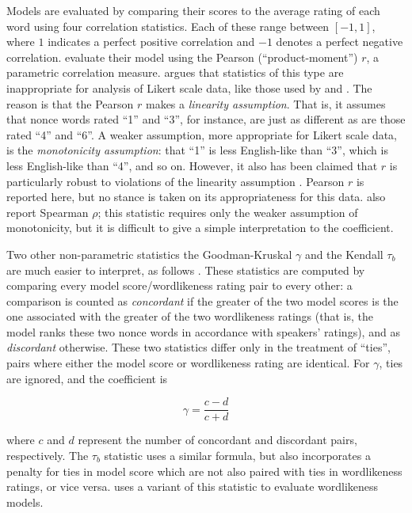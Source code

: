 Models are evaluated by comparing their scores to the average rating of each word using four correlation statistics. Each of these range between $[-1, 1]$, where $1$ indicates a perfect positive correlation and $-1$ denotes a perfect negative correlation. \citet{Hayes2008a} evaluate their model using the Pearson (``product-moment'') $r$, a parametric correlation measure.  \citet{Stevens1946} argues that statistics of this type are inappropriate for analysis of Likert scale data, like those used by \citet{Albright2007} and \citet{Albright2003b}.
The reason is that the Pearson $r$ makes a \emph{linearity assumption}. That is, it assumes that nonce words rated ``1'' and  ``3'', for instance, are just as different as are those rated ``4'' and ``6''. A weaker assumption, more appropriate for Likert scale data, is the \emph{monotonicity assumption}: that ``1'' is less English-like than ``3'', which is less English-like than ``4'', and so on. However, it also has been claimed that $r$ is particularly robust to violations of the linearity assumption \citep[e.g.,][]{Havlicek1976}. Pearson $r$ is reported here, but no stance is taken on its appropriateness for this data.
\citeauthor{Hayes2008a} also report Spearman $\rho$; this statistic requires only the weaker assumption of monotonicity, but it is difficult to give a simple interpretation to the coefficient. 

Two other non-parametric statistics the Goodman-Kruskal $\gamma$ and the Kendall $\tau_b$ are much easier to interpret, as follows \citep{Noether1981}. 
These statistics are computed by comparing every model score/wordlikeness rating pair to every other: a comparison is counted as \emph{concordant} if the greater of the two model scores is the one associated with the greater of the two wordlikeness ratings (that is, the model ranks these two nonce words in accordance with speakers' ratings), and as \emph{discordant} otherwise. 
These two statistics differ only in the treatment of ``ties'', pairs where either the model score or wordlikeness rating are identical. 
For $\gamma$, ties are ignored, and the coefficient is 

\begin{equation*}
\gamma = \displaystyle\frac{c - d}{c + d}
\end{equation*}

\noindent
where $c$ and $d$ represent the number of concordant and discordant pairs, respectively. The $\tau_b$ statistic uses a similar formula, but also incorporates a penalty for ties in model score which are not also paired with ties in wordlikeness ratings, or vice versa. \citet{Albright2009a} uses a variant of this statistic to evaluate wordlikeness models.

